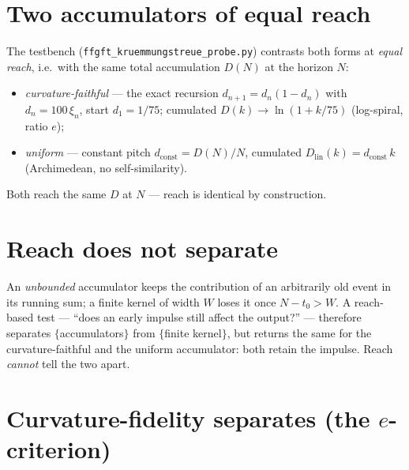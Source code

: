 \section{Two accumulators of equal reach}

The testbench (\texttt{ffgft\_kruemmungstreue\_probe.py}) contrasts both forms at \emph{equal
reach}, i.e.\ with the same total accumulation $D(N)$ at the horizon $N$:
\begin{itemize}
\item \emph{curvature-faithful} --- the exact recursion $d_{n+1}=d_n(1-d_n)$ with
$d_n=100\,\xi_n$, start $d_1=1/75$; cumulated $D(k)\to\ln(1+k/75)$ (log-spiral, ratio $e$);
\item \emph{uniform} --- constant pitch $d_{\text{const}}=D(N)/N$, cumulated
$D_{\text{lin}}(k)=d_{\text{const}}\,k$ (Archimedean, no self-similarity).
\end{itemize}
Both reach the same $D$ at $N$ --- reach is identical by construction.

\section{Reach does not separate}

An \emph{unbounded} accumulator keeps the contribution of an arbitrarily old event in its
running sum; a finite kernel of width $W$ loses it once $N-t_0>W$. A reach-based test ---
\enquote{does an early impulse still affect the output?} --- therefore separates
$\{$accumulators$\}$ from $\{$finite kernel$\}$, but returns the same for the curvature-faithful
and the uniform accumulator: both retain the impulse. Reach \emph{cannot} tell the two apart.

\section{Curvature-fidelity separates (the $e$-criterion)}


